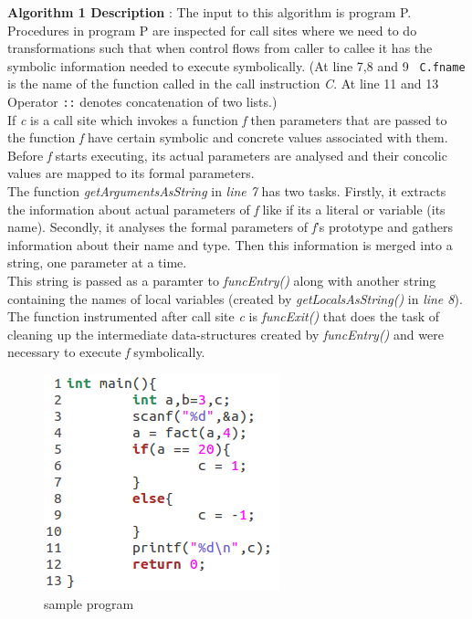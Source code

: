\documentclass[12pt,oneside]{book}
\begin{document}
\textbf{Algorithm 1 Description} : The input to this algorithm is program P. Procedures in program P are inspected for call sites where we need to do transformations such that when control flows from caller to callee it has the symbolic information needed to execute symbolically. (At line 7,8 and 9 \texttt{ C.fname} is the name of the function called in the call instruction \textit{C}. At line 11 and 13 Operator \texttt{::} denotes concatenation of two lists.)\\
If \textit{c} is a call site which invokes a function \textit{f} then parameters that are passed to the function \textit{f} have certain symbolic and concrete values associated with them. Before \textit{f} starts executing, its actual parameters are analysed and their concolic values are mapped to its formal parameters.\\ 
The function \textit{getArgumentsAsString} in \textit{line 7} has two tasks. Firstly, it extracts the information about actual parameters of \textit{f} like if its a literal or variable (its name). Secondly, it analyses the formal parameters of \textit{f}'s prototype and gathers information about their name and type. Then this information is merged into a string, one parameter at a time.\\

This string is passed as a paramter to \textit{funcEntry()} along with another string containing the names of local variables (created by \textit{getLocalsAsString()} in \textit{line 8}). The function instrumented after call site \textit{c} is \textit{funcExit()} that does the task of cleaning up the intermediate data-structures created by \textit{funcEntry()} and were necessary to execute \textit{f} symbolically.\\



\vspace{0.4cm}

\begin{figure}[htbp]
\centering
\includegraphics[scale=0.53]{env1_orig.png}
\caption{sample program}
\end{figure}  
\end{document}
